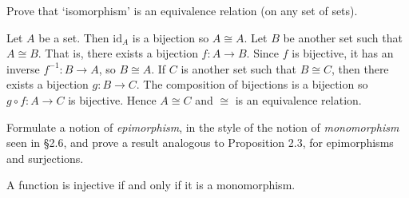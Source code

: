 \documentclass[../../master.tex]{subfiles}
\begin{document}
  \begin{problem}
    Prove that `isomorphism' is an equivalence relation (on any set of sets).
  \end{problem}

  \begin{solution}
    Let \(A\) be a set. Then \(\text{id}_{A}\) is a bijection so \(A \cong A\).
    Let \(B\) be another set such that \(A \cong B\). That is, there exists a bijection \(f: A \to B\).
    Since \(f\) is bijective, it has an inverse \(f^{-1}: B \to A\), so \(B \cong A\).
    If \(C\) is another set such that \(B \cong C\), then there exists a bijection \(g: B \to C\).
    The composition of bijections is a bijection so \(g \circ f: A \to C\) is bijective.
    Hence \(A \cong C\) and \(\cong\) is an equivalence relation.
  \end{solution}

  \begin{problem}
    Formulate a notion of \textit{epimorphism}, in the style of the notion of \textit{monomorphism} seen in \S 2.6,
    and prove a result analogous to Proposition 2.3, for epimorphisms and surjections.
  \end{problem}

  \begin{proposition}[Proposition 2.3]
    A function is injective if and only if it is a monomorphism.
  \end{proposition}
\end{document}
